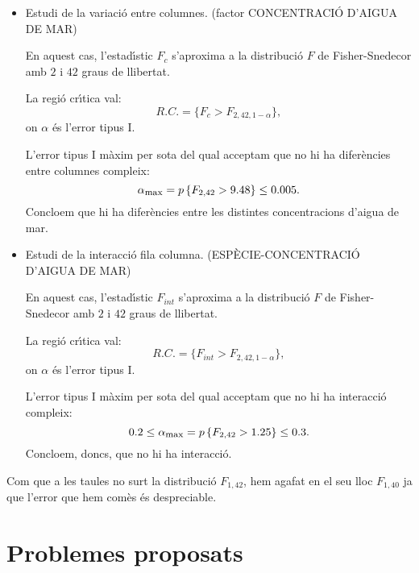 {\begin{itemize}
	En aquest cas, l'estad\'{\i}stic $F_f$ s'aproxima a la distribuci\'o $F$ 
	de Fisher-Snedecor amb $1$ i $42$ graus de llibertat.
	
	La regi\'o cr\'{\i}tica val:
	\[
	R.C. =\{F_f > F_{1,42,1-\alpha}\},
	\]
	on $\alpha$ \'es l'error tipus I.
	
	L'error tipus I m\`axim per sota del qual acceptam que no hi ha 
	difer\`encies entre files compleix:
	\[
	0.1\leq \alpha_{\mbox{\footnotesize max}}=\pp{F_{1,42}>1.74}\leq 0.2.
	\]
	Acceptam, doncs, que no hi ha difer\`encies degudes a l'esp\`ecie.

	\item  Estudi de la variaci\'o entre columnes. (factor CONCENTRACI\'O 
	D'AIGUA DE MAR)
	
	En aquest cas, l'estad\'{\i}stic $F_c$ s'aproxima a la distribuci\'o $F$ 
	de Fisher-Snedecor amb $2$ i $42$ graus de llibertat.
	
	La regi\'o cr\'{\i}tica val:
	\[
	R.C. =\{F_c > F_{2,42,1-\alpha}\},
	\]
	on $\alpha$ \'es l'error tipus I.
	
	L'error tipus I m\`axim per sota del qual acceptam que no hi ha 
	difer\`encies entre columnes compleix:
	\[
	\alpha_{\mbox{\footnotesize max}}=p\left\{F_{2,42}>9.48\right\}\leq 0.005.
	\]
	Concloem que hi ha difer\`encies entre les distintes concentracions 
	d'aigua de mar.
	\item  Estudi de la interacci\'o fila columna. (ESP\`ECIE-CONCENTRACI\'O 
	D'AIGUA DE MAR)
	
	En aquest cas, l'estad\'{\i}stic $F_{int}$ s'aproxima a la distribuci\'o $F$ 
	de Fisher-Snedecor amb $2$ i $42$ graus de llibertat.
	
	La regi\'o cr\'{\i}tica val:
	\[
	R.C. =\{F_{int} > F_{2,42,1-\alpha}\},
	\]
	on $\alpha$ \'es l'error tipus I.
	
	L'error tipus I m\`axim per sota del qual acceptam que no hi ha 
	interacci\'o compleix:
	\[
	0.2\leq \alpha_{\mbox{\footnotesize max}}=p\left\{F_{2,42}>1.25\right\}\leq 0.3.
	\]
	Concloem, doncs, que no hi ha interacci\'o.
\end{itemize}
{\footnotesize Com que a les taules no surt la distribuci\'o $F_{1,42}$, 
hem agafat en el seu lloc $F_{1,40}$ ja que l'error que hem com\`es \'es 
	despreciable.}
}

\section{Problemes proposats}

